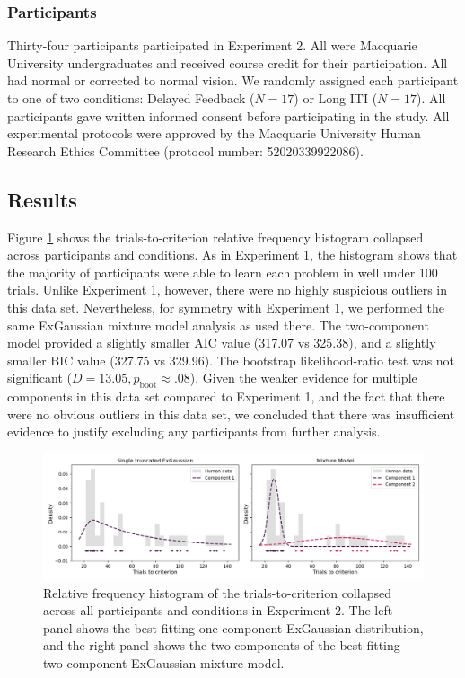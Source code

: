 \documentclass[doc, floatsintext]{apa7}
\begin{document}
\subsubsection{Participants}
Thirty-four participants participated in Experiment 2. All
were Macquarie University undergraduates and received course
credit for their participation. All had normal or corrected
to normal vision. We randomly assigned each participant to
one of two conditions: Delayed Feedback ($N = 17$) or Long
ITI ($N = 17$).  All participants gave written informed
consent before participating in the study. All experimental
protocols were approved by the Macquarie University Human
Research Ethics Committee (protocol number: 52020339922086). 

\subsection{Results}
Figure \ref{fig_mm_hist_2} shows the trials-to-criterion
relative frequency histogram collapsed across participants
and conditions. As in Experiment 1, the histogram shows that
the majority of participants were able to learn each problem
in well under 100 trials. Unlike Experiment 1, however,
there were no highly suspicious outliers in this data set.
Nevertheless, for symmetry with Experiment 1, we performed
the same ExGaussian mixture model analysis as used there.
The two-component model provided a slightly smaller AIC
value (317.07 vs 325.38), and a slightly smaller BIC value
(327.75 vs 329.96). The bootstrap likelihood-ratio test was
not significant ($D = 13.05, p_{\text{boot}} \approx .08$).
Given the weaker evidence for multiple components in this
data set compared to Experiment 1, and the fact that there
were no obvious outliers in this data set, we concluded that
there was insufficient evidence to justify excluding any
participants from further analysis.

\begin{figure}
  \centering
  \includegraphics[width=1\textwidth]{../figures/fig_exp_2_mm_trunc_exgauss_compare.png}
  \caption{
      Relative frequency histogram of the
      trials-to-criterion collapsed across all participants
      and conditions in Experiment 2. The left panel shows
      the best fitting one-component ExGaussian
      distribution, and the right panel shows the two
      components of the best-fitting two component
      ExGaussian mixture model.
}
  \label{fig_mm_hist_2}
\end{figure}
\end{document}
